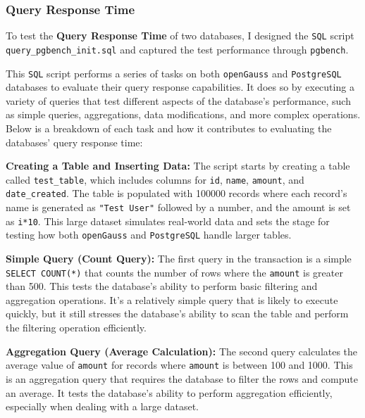 \documentclass[12pt,a4paper,cs4size]{ctexart}
\begin{document}
\subsubsection*{Query Response Time}

To test the \textbf{Query Response Time} of two databases, I designed the \texttt{SQL} script\\
\texttt{query\_pgbench\_init.sql}\cite{github2024} and captured the test performance through \texttt{pgbench}.

This \texttt{SQL} script performs a series of tasks on both \texttt{openGauss} and \texttt{PostgreSQL} databases to evaluate their query response capabilities. It does so by executing a variety of queries that test different aspects of the database's performance, such as simple queries, aggregations, data modifications, and more complex operations. Below is a breakdown of each task and how it contributes to evaluating the databases' query response time:

\vspace{0.5cm}

\textbf{Creating a Table and Inserting Data:} The script starts by creating a table called \texttt{test\_table}, which includes columns for \texttt{id}, \texttt{name}, \texttt{amount}, and \texttt{date\_created}. The table is populated with 100000 records where each record's name is generated as \texttt{"Test User"} followed by a number, and the amount is set as \texttt{i*10}. This large dataset simulates real-world data and sets the stage for testing how both \texttt{openGauss} and \texttt{PostgreSQL} handle larger tables.

\textbf{Simple Query (Count Query):} The first query in the transaction is a simple \texttt{SELECT COUNT(*)} that counts the number of rows where the \texttt{amount} is greater than 500. This tests the database's ability to perform basic filtering and aggregation operations. It's a relatively simple query that is likely to execute quickly, but it still stresses the database's ability to scan the table and perform the filtering operation efficiently.

\textbf{Aggregation Query (Average Calculation):} The second query calculates the average value of \texttt{amount} for records where \texttt{amount} is between 100 and 1000. This is an aggregation query that requires the database to filter the rows and compute an average. It tests the database's ability to perform aggregation efficiently, especially when dealing with a large dataset.
\end{document}
